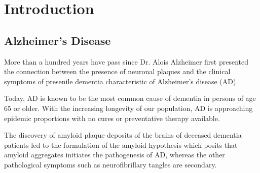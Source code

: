 \chapter{Introduction}


\section{Alzheimer's Disease}
\begin{outline}[enumerate]
	\1 More than a hundred years have pass since Dr. Alois Alzheimer first presented the connection between the presence of neuronal plaques and the clinical symptoms of presenile dementia characteristic of Alzheimer's disease (AD).

	\1 Today, AD is known to be the most common cause of dementia in persons of age 65 or older. With the increasing longevity of our population, AD is approaching epidemic proportions with no cures or preventative therapy available.\cite{Blennow:2006wd}

	\1 The discovery of amyloid plaque deposits of the brains of deceased dementia patients led to the formulation of the amyloid hypothesis which posits that amyloid aggregates initiates the pathogenesis of AD, whereas the other pathological symptoms such as neurofibrillary tangles are secondary.

\end{outline}


